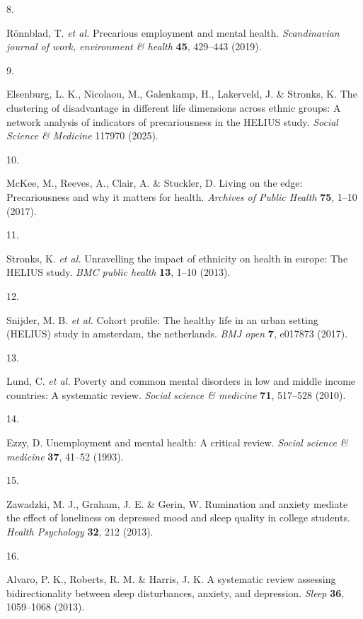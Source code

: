 \documentclass[
]{article}
\newlength{\cslhangindent}
\newlength{\csllabelwidth}
\newenvironment{CSLReferences}[2] %
 {\begin{list}{}{%
  \setlength{\itemindent}{0pt}
  \setlength{\leftmargin}{0pt}
  \setlength{\parsep}{0pt}
  \ifodd #1
   \setlength{\leftmargin}{\cslhangindent}
   \setlength{\itemindent}{-1\cslhangindent}
  \fi
  \setlength{\itemsep}{#2\baselineskip}}}
 {\end{list}}
\newcommand{\CSLLeftMargin}[1]{\parbox[t]{\csllabelwidth}{\strut#1\strut}}
\newcommand{\CSLRightInline}[1]{\parbox[t]{\linewidth - \csllabelwidth}{\strut#1\strut}}
\begin{document}
\begin{CSLReferences}{0}{0}
\CSLLeftMargin{8. }%
\CSLRightInline{Rönnblad, T. \emph{et al.} Precarious employment and
mental health. \emph{Scandinavian journal of work, environment \&
health} \textbf{45}, 429--443 (2019).}

\CSLLeftMargin{9. }%
\CSLRightInline{Elsenburg, L. K., Nicolaou, M., Galenkamp, H.,
Lakerveld, J. \& Stronks, K. The clustering of disadvantage in different
life dimensions across ethnic groups: A network analysis of indicators
of precariousness in the HELIUS study. \emph{Social Science \& Medicine}
117970 (2025).}

\CSLLeftMargin{10. }%
\CSLRightInline{McKee, M., Reeves, A., Clair, A. \& Stuckler, D. Living
on the edge: Precariousness and why it matters for health.
\emph{Archives of Public Health} \textbf{75}, 1--10 (2017).}

\CSLLeftMargin{11. }%
\CSLRightInline{Stronks, K. \emph{et al.} Unravelling the impact of
ethnicity on health in europe: The HELIUS study. \emph{BMC public
health} \textbf{13}, 1--10 (2013).}

\CSLLeftMargin{12. }%
\CSLRightInline{Snijder, M. B. \emph{et al.} Cohort profile: The healthy
life in an urban setting (HELIUS) study in amsterdam, the netherlands.
\emph{BMJ open} \textbf{7}, e017873 (2017).}

\CSLLeftMargin{13. }%
\CSLRightInline{Lund, C. \emph{et al.} Poverty and common mental
disorders in low and middle income countries: A systematic review.
\emph{Social science \& medicine} \textbf{71}, 517--528 (2010).}

\CSLLeftMargin{14. }%
\CSLRightInline{Ezzy, D. Unemployment and mental health: A critical
review. \emph{Social science \& medicine} \textbf{37}, 41--52 (1993).}

\CSLLeftMargin{15. }%
\CSLRightInline{Zawadzki, M. J., Graham, J. E. \& Gerin, W. Rumination
and anxiety mediate the effect of loneliness on depressed mood and sleep
quality in college students. \emph{Health Psychology} \textbf{32}, 212
(2013).}

\CSLLeftMargin{16. }%
\CSLRightInline{Alvaro, P. K., Roberts, R. M. \& Harris, J. K. A
systematic review assessing bidirectionality between sleep disturbances,
anxiety, and depression. \emph{Sleep} \textbf{36}, 1059--1068 (2013).}


\end{CSLReferences}
\end{document}
